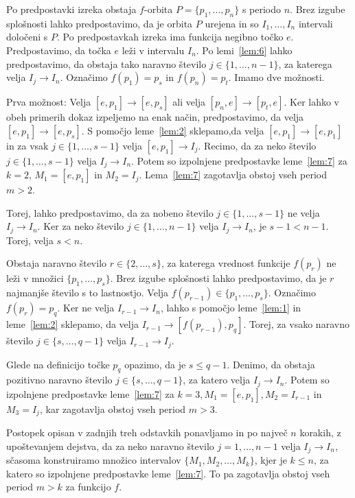 \documentclass[../TG_magistrsko_delo_sections.tex]{subfiles}
\begin{document}
\begin{dokaz}
Po predpostavki izreka obstaja $f$-orbita $P = \{p_1, \dots, p_n\}$ s periodo $n$. Brez izgube splošnosti lahko predpostavimo, da je orbita $P$ urejena in so $I_1, \dots, I_n$ intervali določeni s $P$. Po predpostavkah izreka ima funkcija negibno točko $e$. Predpostavimo, da točka $e$ leži v intervalu $I_n$. Po lemi~\ref{lem:6} lahko predpostavimo, da obstaja tako naravno število $j \in \{1, \dots, n-1\}$, za katerega velja $I_j \to I_n$.
Označimo $f(p_1) = p_s$ in $f(p_n) = p_t$. Imamo dve možnosti.

Prva možnost: 
Velja $[e, p_1] \to [e, p_s]$ ali velja $[p_n, e] \to [p_t, e]$. Ker lahko v obeh primerih dokaz izpeljemo na enak način, predpostavimo, da velja $[e, p_1] \to [e, p_s]$. S pomočjo leme~\ref{lem:2} sklepamo,da velja $[e, p_1] \to [e, p_1]$ in za vsak $j \in \{1, \dots, s-1\}$ velja $[e, p_1] \to I_j$.
Recimo, da za neko število $j \in \{1, \dots, s-1\}$ velja $I_j \to I_n$. Potem so izpolnjene predpostavke leme~\ref{lem:7} za $k=2$, $M_1=[e, p_1]$ in $M_2 = I_j$. Lema~\ref{lem:7} zagotavlja obstoj vseh period $m > 2$.

Torej, lahko predpostavimo, da za nobeno število $j \in \{1, \dots, s-1\}$ ne velja $I_j \to I_n$. Ker za neko število $j \in \{1, \dots, n-1\}$ velja $I_j \to I_n$, je $s-1 < n-1$. Torej, velja $s < n$. 

Obstaja naravno število $r \in \{2, \dots, s\}$, za katerega vrednost funkcije $f(p_r)$ ne leži v množici $\{p_1, \dots, p_s \}$. %
Brez izgube splošnosti lahko predpostavimo, da je $r$ najmanjše število s to lastnostjo. Velja $f(p_{r-1}) \in \{p_1, \dots, p_s\}$. Označimo $f(p_r) = p_q$. Ker ne velja $I_{r-1} \to I_n$, lahko s pomočjo leme~\ref{lem:1} in leme~\ref{lem:2} sklepamo, da velja $I_{r-1} \to [f(p_{r-1}), p_q]$. Torej, za vsako naravno število $j \in \{s, \dots, q-1\}$ velja $I_{r-1} \to I_j$. 

Glede na definicijo točke $p_q$ opazimo, da je $s \leq q-1$. Denimo, da obstaja pozitivno naravno število $j \in \{s, \dots, q-1\}$, za katero velja $I_j \to I_n$. Potem so izpolnjene predpostavke leme~\ref{lem:7} za $k=3, M_1 = [e, p_1], M_2 = I_{r-1}$ in  $M_3 =I_j$, kar zagotavlja obstoj vseh period $m > 3$.

Postopek opisan v zadnjih treh odstavkih ponavljamo in po največ $n$ korakih, z upoštevanjem dejstva, da za neko naravno število $j = 1, \dots, n-1$ velja $I_j \to I_n$, sčasoma konstruiramo množico intervalov $\{M_1, M_2, \dots, M_k\}$, kjer je $k \leq n$, za katero so izpolnjene predpostavke leme~\ref{lem:7}. To pa zagotavlja obstoj vseh period $m > k$ za funkcijo $f$.


\end{dokaz}
\end{document}
